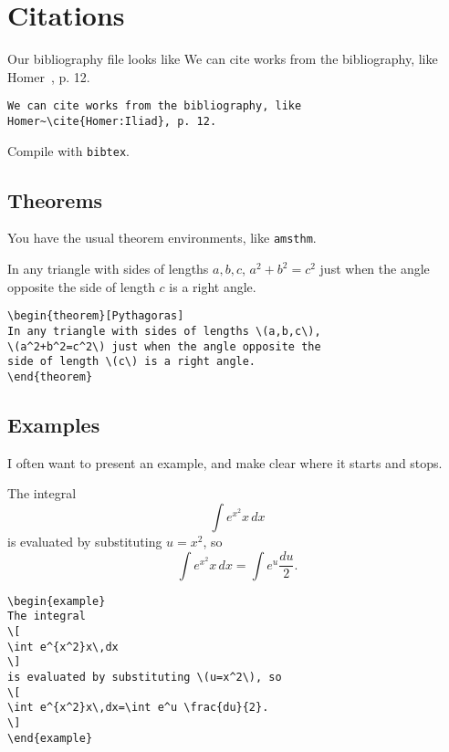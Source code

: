 \chapter{Citations}
Our bibliography file looks like
We can cite works from the bibliography, like Homer~\cite{Homer:Iliad}, p. 12.
\begin{Verbatim}[frame=leftline]
We can cite works from the bibliography, like Homer~\cite{Homer:Iliad}, p. 12.
\end{Verbatim}
Compile with \verb!bibtex!.
\section{Theorems}
You have the usual theorem environments, like \texttt{amsthm}.
\begin{theorem}[Pythagoras]
In any triangle with sides of lengths \(a,b,c\), \(a^2+b^2=c^2\) just when the angle opposite the side of length \(c\) is a right angle.
\end{theorem}
\begin{Verbatim}[frame=leftline]
\begin{theorem}[Pythagoras]
In any triangle with sides of lengths \(a,b,c\),
\(a^2+b^2=c^2\) just when the angle opposite the
side of length \(c\) is a right angle.
\end{theorem}
\end{Verbatim}
\newpage
\section{Examples}
I often want to present an example, and make clear where it starts and stops.
\begin{example}
The integral
\[
\int e^{x^2}x\,dx
\]
is evaluated by substituting \(u=x^2\), so
\[
\int e^{x^2}x\,dx=\int e^u \frac{du}{2}.
\]
\end{example}
\begin{Verbatim}[frame=leftline]
\begin{example}
The integral
\[
\int e^{x^2}x\,dx
\]
is evaluated by substituting \(u=x^2\), so
\[
\int e^{x^2}x\,dx=\int e^u \frac{du}{2}.
\]
\end{example}
\end{Verbatim}
